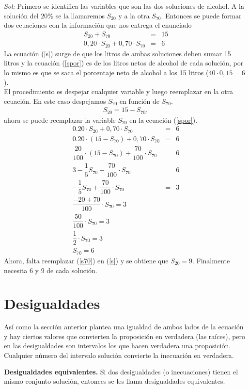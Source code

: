 \noindent\textit{Sol:} Primero se identifica las variables que son las dos soluciones de alcohol. A la solución del $20\%$ se la llamaremos $S_{20}$ y a la otra $S_{70}$. Entonces se puede formar dos ecuaciones con la información que nos entrega el enunciado 
\begin{eqnarray}
S_{20}+S_{70}&=&15 \label{s}\\
0,20\cdot S_{20}+0,70\cdot S_{70}&=&6\label{spor}
\end{eqnarray}
 La ecuación (\ref{s}) surge de que los litros de ambas soluciones deben sumar 15 litros y la ecuación (\ref{spor}) es de los litros netos de alcohol de cada solución, por lo mismo es que se saca el porcentaje neto de alcohol a los 15 litros ($40\cdot 0,15=6$). \\
 El procedimiento es despejar cualquier variable y luego reemplazar en la otra ecuación. En este caso despejamos $S_{20}$ en función de $S_{70}$.
\begin{eqnarray*}
S_{20}=15-S_{70},
\end{eqnarray*}
ahora se puede reemplazar la variable $S_{20}$ en la ecuación (\ref{spor}).
\begin{eqnarray}
0.20\cdot S_{20}+0,70\cdot S_{70}&=&6\nonumber\\
0.20\cdot (15-S_{70})+0,70\cdot S_{70}&=&6\nonumber\\
\dfrac{20}{100}\cdot (15-S_{70})+\dfrac{70}{100}\cdot S_{70}&=&6\nonumber\\
3-\dfrac{1}{5} S_{70}+\dfrac{70}{100}\cdot S_{70}&=&6\nonumber\\
-\dfrac{1}{5} S_{70}+\dfrac{70}{100}\cdot S_{70}&=&3\nonumber\\
\dfrac{-20+70}{100}\cdot S_{70}=3\nonumber\\
\dfrac{50}{100}\cdot S_{70}=3\nonumber\\
\dfrac{1}{2}\cdot S_{70}=3\nonumber\\
S_{70}=6\label{s70}
\end{eqnarray}
Ahora, falta reemplazar (\ref{s70}) en (\ref{s}) y se obtiene que $S_{20}=9$. Finalmente necesita 6 y 9 de cada solución.

\section{Desigualdades}
Así como la sección anterior plantea una igualdad de ambos lados de la ecuación y hay ciertos valores que convierten la proposición en verdadera (las raíces), pero en las desigualdades son intervalos los que hacen verdadera una proposición. Cualquier número del intervalo solución convierte la inecuación en verdadera.\\
\begin{mydef}
\textbf{Desigualdades equivalentes.} Si dos desigualdades (o inecuaciones) tienen el mismo conjunto solución, entonces se les llama desigualdades equivalentes.\\
\end{mydef}

